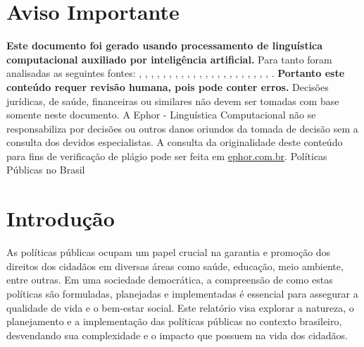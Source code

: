 \documentclass[
   article,       
   12pt,          
   oneside,       
   a4paper,       
   english,       
   brazil,        
   sumario=tradicional
   ]{abntex2}
\begin{document}
\frenchspacing 
\maketitle

\textual
\section{Aviso Importante}
\textbf{Este documento foi gerado usando processamento de linguística computacional auxiliado por inteligência artificial.} Para tanto foram analisadas as seguintes fontes:  \cite{A_CAUSA_E_AS_POLITICAS_DE_DIREITOS_HUMANOS_NO}, \cite{Ciclo_de_Politicas_Publicas_por_que_e_importa}, \cite{Conheca_o_ciclo_das_politicas_publicas__Polit}, \cite{Educacao_Inclusiva_Conheca_o_historico_da_leg}, \cite{Em_Buenos_Aires_Silvio_Almeida_defende_a_inst}, \cite{Entendendo_a_Tipologia_de_Politicas_Publicas_}, \cite{Escola_Nacional_de_Administracao_Publica__Wik}, \cite{Especialista_em_politicas_publicas_e_gestao_g}, \cite{FEDERALISMO_E_POLITICAS_PUBLICAS_NO_BRASIL_Ho}, \cite{Institucionalizacao_das_politicas_em_Direitos}, \cite{Ministerio_do_Planejamento_e_Orcamento__Wikip}, \cite{Ministro_defende_que_direitos_humanos_precisa}, \cite{Politica_conceito_politicas_publicas_e_partid}, \cite{Politica_publica__o_que_e_tipos_de_politicas_}, \cite{Politica_publica__Wikipedia_a_enciclopedia_li}, \cite{Politicas_publicas__Wikipedia_la_enciclopedia}, \cite{Politicas_Publicas_entenda_o_que_sao_para_que}, \cite{Politicas_Publicas_o_que_sao_e_para_que_serve}, \cite{Politicas_publicas_o_que_sao_e_para_que_serve}, \cite{Politicas_publicas_o_que_sao_quem_faz_e_tipos}, \cite{Politicas_publicas_o_que_sao_tipos_e_exemplos}, \cite{Revista_USP_119__Dossie_1_Democracia_e_politi}, \cite{TCU_Ciclo_das_politicas_publicas__Tudo_o_que_}.
\textbf{Portanto este conteúdo requer revisão humana, pois pode conter erros.} Decisões jurídicas, de saúde, financeiras ou similares não devem ser tomadas com base somente neste documento. A Ephor - Linguística Computacional não se responsabiliza por decisões ou outros danos oriundos da tomada de decisão sem a consulta dos devidos especialistas.
A consulta da originalidade deste conteúdo para fins de verificação de plágio pode ser feita em \href{http://www.ephor.com.br}{ephor.com.br}.
Políticas Públicas no Brasil

\section{Introdução}
As políticas públicas ocupam um papel crucial na garantia e promoção dos direitos dos cidadãos em diversas áreas como saúde, educação, meio ambiente, entre outras. Em uma sociedade democrática, a compreensão de como estas políticas são formuladas, planejadas e implementadas é essencial para assegurar a qualidade de vida e o bem-estar social. Este relatório visa explorar a natureza, o planejamento e a implementação das políticas públicas no contexto brasileiro, desvendando sua complexidade e o impacto que possuem na vida dos cidadãos.
\end{document}
